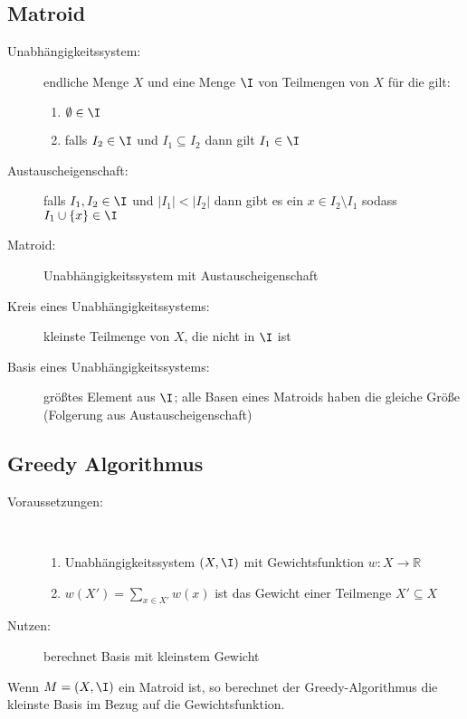 \vspace*{-0.75\baselineskip}
\subsection{Matroid}
\begin{description}
	\item[Unabhängigkeitssystem:] endliche Menge $X$ und eine Menge $\I$ von Teilmengen von $X$ für die gilt:
		\begin{enumerate}
			\item $\emptyset \in \I$
			\item falls $I_2 \in \I$ und $I_1 \subseteq I_2$ dann gilt $I_1 \in \I$
		\end{enumerate}
	\item[Austauscheigenschaft:] falls $I_1,I_2 \in \I$ und $|I_1|<|I_2|$ dann gibt es ein $x\in I_2\setminus I_1$ sodass $I_1 \cup \{x\} \in \I$
	\item[Matroid:] Unabhängigkeitssystem mit Austauscheigenschaft
\end{description}
\topbreak
\up\up
\begin{description}
	\item[Kreis eines Unabhängigkeitssystems:] kleinste Teilmenge von $X$, die nicht in $\I$ ist
	\item[Basis eines Unabhängigkeitssystems:] größtes Element aus $\I$; alle Basen eines Matroids haben die gleiche Größe (Folgerung aus Austauscheigenschaft)
\end{description}
\subsection{Greedy Algorithmus}
\begin{description}
	\item[Voraussetzungen:]\ \\\up
		\begin{enumerate}
			\item Unabhängigkeitssystem $(X,\I)$ mit Gewichtsfunktion $w : X \rightarrow \mathbb{R}$
			\item $w(X') = \sum\limits_{x\in X'} w(x)$ ist das Gewicht einer Teilmenge $X' \subseteq X$
		\end{enumerate}
	\item[Nutzen:] berechnet Basis mit kleinstem Gewicht
\end{description}
Wenn $M=(X,\I)$ ein Matroid ist, so berechnet der Greedy-Algorithmus die kleinste Basis im Bezug auf die Gewichtsfunktion.\\
\missProof\\\ \\
